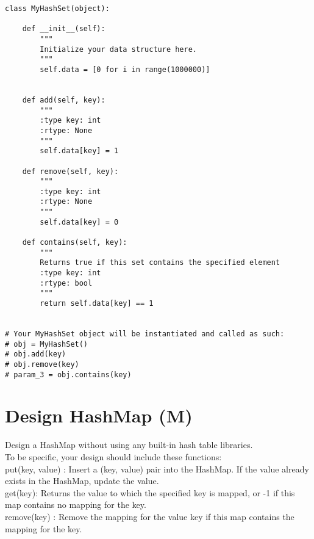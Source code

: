 \begin{lstlisting}
class MyHashSet(object):

    def __init__(self):
        """
        Initialize your data structure here.
        """
        self.data = [0 for i in range(1000000)]
        

    def add(self, key):
        """
        :type key: int
        :rtype: None
        """
        self.data[key] = 1

    def remove(self, key):
        """
        :type key: int
        :rtype: None
        """
        self.data[key] = 0

    def contains(self, key):
        """
        Returns true if this set contains the specified element
        :type key: int
        :rtype: bool
        """
        return self.data[key] == 1


# Your MyHashSet object will be instantiated and called as such:
# obj = MyHashSet()
# obj.add(key)
# obj.remove(key)
# param_3 = obj.contains(key)
\end{lstlisting}

\section{Design HashMap (M)}
Design a HashMap without using any built-in hash table libraries.\\

To be specific, your design should include these functions:\\
    put(key, value) : Insert a (key, value) pair into the HashMap. If the value already exists in the HashMap, update the value.\\
    get(key): Returns the value to which the specified key is mapped, or -1 if this map contains no mapping for the key.\\
    remove(key) : Remove the mapping for the value key if this map contains the mapping for the key.\\

